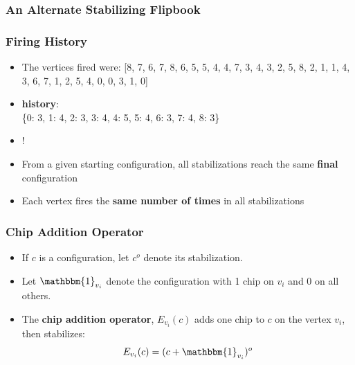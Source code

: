 \documentclass{beamer}
\begin{document}
\begin{frame}
\frametitle{An Alternate Stabilizing Flipbook}

\end{frame}

\begin{frame}
\frametitle{Firing History}
  \begin{itemize}
    \item The vertices fired were: [8, 7, 6, 7, 8, 6, 5, 5, 4, 4, 7, 3, 4, 3, 2, 5, 8, 2, 1, 1, 4, 3, 6, 7, 1, 2, 5, 4, 0, 0, 3, 1, 0]
    \item \textbf{history}: \\

    \{0: 3, 1: 4, 2: 3, 3: 4, 4: 5, 5: 4, 6: 3, 7: 4, 8: 3\}

    \item !
    \item From a given starting configuration, all stabilizations reach the same \textbf{final}
    configuration
    \item Each vertex fires the \textbf{same number of times} in all stabilizations
  \end{itemize}
\end{frame}


\begin{frame}
\frametitle{Chip Addition Operator}
  \begin{itemize}
  \item If $c$ is a configuration, let $c^o$ denote its stabilization.
  \item Let $\mathbbm{1}_{v_i}$ denote the configuration with 1 chip on $v_i$ and $0$ on all others.
  \item The \textbf{chip addition operator}, $E_{v_i}(c)$ adds one chip to $c$ on the vertex $v_i$, then stabilizes: \[E_{v_i}(c) = (c+\mathbbm{1}_{v_i})^o\]
  \end{itemize}
\end{frame}
\end{document}
